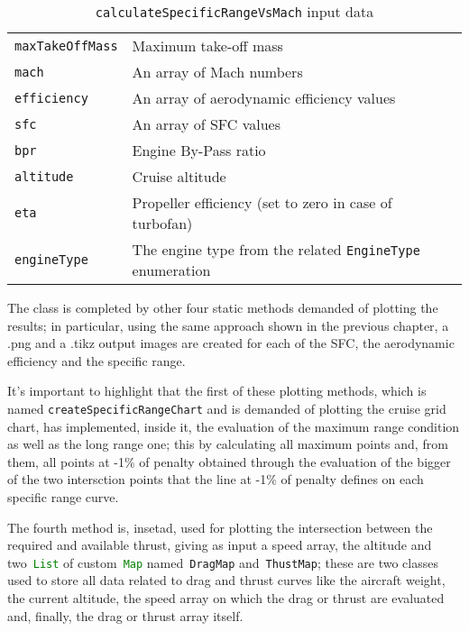 \begin{table}[!b]
\begin{tabular}{p{7cm}p{7.5cm}}
\toprule
\lstinline[language=Java]!maxTakeOffMass! & Maximum take-off mass \\[0.1	cm]
\lstinline[language=Java]!mach!	& An array of Mach numbers \\[0.1cm]
\lstinline[language=Java]!efficiency!	& An array of aerodynamic efficiency values \\[0.1cm]
\lstinline[language=Java]!sfc!	& An array of SFC values \\[0.1cm]
\lstinline[language=Java]!bpr! & Engine By-Pass ratio \\[0.1cm]
\lstinline[language=Java]!altitude! & Cruise altitude \\[0.1cm]
\lstinline[language=Java]!eta!	& Propeller efficiency (set to zero in case of turbofan) \\[0.1cm]
\lstinline[language=Java]!engineType! & The engine type from the related \lstinline[language=Java]!EngineType! enumeration \\
\bottomrule
\end{tabular}
\caption{ \lstinline[language=Java]!calculateSpecificRangeVsMach! input data}
\label{table:Table3}
\end{table}

\bigskip
\noindent
The class is completed by other four static methods demanded of plotting the results; in particular, using the same approach shown in the previous chapter, a .png and a .tikz output images are created for each of the SFC, the aerodynamic efficiency and the specific range.

It's important to highlight that the first of these plotting methods, which is named \lstinline[language=Java]!createSpecificRangeChart! and is demanded of plotting the cruise grid chart, has implemented, inside it, the evaluation of the maximum range condition as well as the long range one; this by calculating all maximum points and, from them, all points at -1\% of penalty obtained through the evaluation of the bigger of the two intersction points that the line at -1\% of penalty defines on each specific range curve.

\noindent
The fourth method is, insetad, used for plotting the intersection between the required and available thrust, giving as input a speed array, the altitude and two~\lstinline[language=Java]!List! of custom~\lstinline[language=Java]!Map! named~\lstinline[language=Java]!DragMap! and~\lstinline[language=Java]!ThustMap!; these are two classes used to store all data related to drag and thrust curves like the aircraft weight, the current altitude, the speed array on which the drag or thrust are evaluated and, finally, the drag or thrust array itself.  

